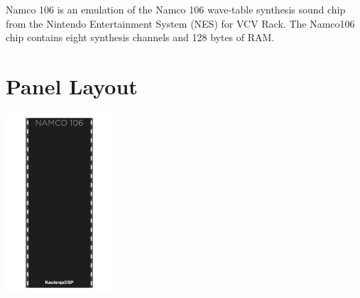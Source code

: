 \documentclass[12pt,a4paper]{article}
\begin{document}
Namco 106 is an emulation of the Namco 106 wave-table synthesis sound chip from the Nintendo Entertainment System (NES) for VCV Rack. The Namco106 chip contains eight synthesis channels and 128 bytes of RAM.


\section{Panel Layout}

\begin{center}
\includegraphics[width=0.3\textwidth]{Namco106-Manual}
\end{center}



\clearpage
\renewcommand\refname{References \& Acknowledgments}
\nocite{*}


\end{document}
